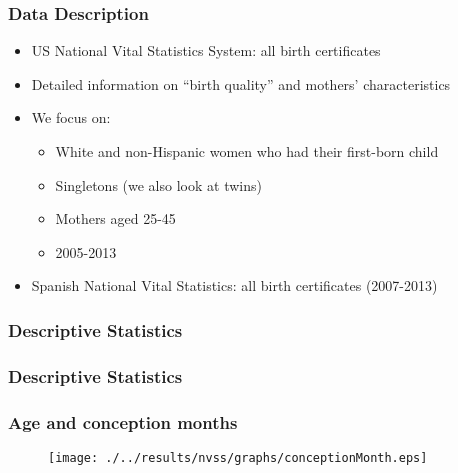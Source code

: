 \documentclass[10pt,letterpaper,subeqn]{beamer}
\begin{document}
\begin{frame}[label=datades]
\frametitle{Data Description}
\begin{itemize}
\item US National Vital Statistics System: all birth certificates
\item Detailed information on ``birth quality'' and mothers' characteristics
\item We focus on:
      \begin{itemize}
        \item White and non-Hispanic women who had their first-born child
        \item Singletons (we also look at twins)
        \item Mothers aged 25-45
        \item 2005-2013
     \end{itemize}
\item Spanish National Vital Statistics: all birth certificates (2007-2013)
\end{itemize}
\end{frame}





\begin{frame}[label=sum2]
\frametitle{Descriptive Statistics}

\end{frame}

\begin{frame}[label=sum2]
\frametitle{Descriptive Statistics}

\end{frame}






\begin{frame}
\frametitle{Age and conception months}
\begin{figure}[htpb!]
  \centering
  \texttt{[image: ./../results/nvss/graphs/conceptionMonth.eps]}
\end{figure}
\end{frame}
\end{document}
